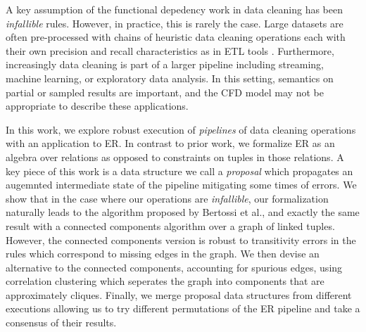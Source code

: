 A key assumption of the functional depedency work in data cleaning has been \emph{infallible} rules.
However, in practice, this is rarely the case.
Large datasets are often pre-processed with chains of heuristic data cleaning operations each with their own precision and recall characteristics as in ETL tools \cite{herzog2007data}.
Furthermore, increasingly data cleaning is part of a larger pipeline including streaming, machine learning, or exploratory data analysis.
In this setting, semantics on partial or sampled results are important, and the CFD model may not be appropriate to describe these applications.

In this work, we explore robust execution of \emph{pipelines} of data cleaning operations with an application to ER.
In contrast to prior work, we formalize ER as an algebra over relations as opposed to constraints on tuples in those relations.
A key piece of this work is a data structure we call a \emph{proposal} which propagates an augemnted intermediate state of the pipeline mitigating some times of errors.
We show that in the case where our operations are \emph{infallible}, our formalization naturally leads to the algorithm proposed by Bertossi et al., and exactly the same result with a connected components algorithm over a graph of linked tuples.
However, the connected components version is robust to transitivity errors in the rules which correspond to missing edges in the graph.
We then devise an alternative to the connected components, accounting for spurious edges, using correlation clustering which seperates the graph into components that are approximately cliques.
Finally, we merge proposal data structures from different executions allowing us to try different permutations of the ER pipeline and take a consensus of their results.









